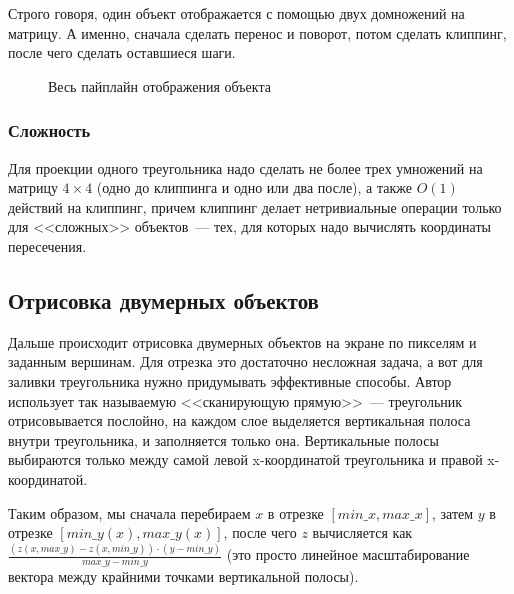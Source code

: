 \documentclass{article}
\begin{document}
Строго говоря, один объект отображается с помощью двух домножений на матрицу. А именно, сначала сделать перенос и поворот, потом сделать клиппинг, после чего сделать оставшиеся шаги.

\begin{center}
\begin{figure}[h]
\caption{Весь пайплайн отображения объекта}
\label{ris:image}
\end{figure}
\end{center}
\newpage

\subsubsection{Сложность} Для проекции одного треугольника надо сделать не более трех умножений на матрицу $4 \times 4$ (одно до клиппинга и одно или два после), а также $O(1)$ действий на клиппинг, причем клиппинг делает нетривиальные операции только для <<сложных>> объектов~--- тех, для которых надо вычислять координаты пересечения.


\subsection{Отрисовка двумерных объектов}
Дальше происходит отрисовка двумерных объектов на экране по пикселям и заданным вершинам. Для отрезка это достаточно несложная задача, а вот для заливки треугольника нужно придумывать эффективные способы. Автор использует так называемую <<сканирующую прямую>>~--- треугольник отрисовывается послойно, на каждом слое выделяется вертикальная полоса внутри треугольника, и заполняется только она. Вертикальные полосы выбираются только между самой левой x-координатой треугольника и правой x-координатой.

Таким образом, мы сначала перебираем $x$ в отрезке $[min\_x, max\_x]$, затем $y$ в отрезке $[min\_y(x), max\_y(x)]$, после чего $z$ вычисляется как $\frac{(z(x, max\_y) - z(x, min\_y)) \cdot (y - min\_y)}{max\_y - min\_y}$ (это просто линейное масштабирование вектора между крайними точками вертикальной полосы).
\end{document}
